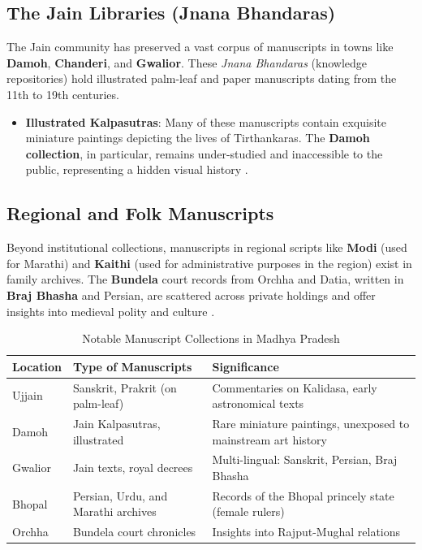 \documentclass{article}
\begin{document}
\subsection{The Jain Libraries (Jnana Bhandaras)}
The Jain community has preserved a vast corpus of manuscripts in towns like \textbf{Damoh}, \textbf{Chanderi}, and \textbf{Gwalior}. These \textit{Jnana Bhandaras} (knowledge repositories) hold illustrated palm-leaf and paper manuscripts dating from the 11th to 19th centuries.
\begin{itemize}
    \item \textbf{Illustrated Kalpasutras}: Many of these manuscripts contain exquisite miniature paintings depicting the lives of Tirthankaras. The \textbf{Damoh collection}, in particular, remains under-studied and inaccessible to the public, representing a hidden visual history \cite{shah2010}.
\end{itemize}

\subsection{Regional and Folk Manuscripts}
Beyond institutional collections, manuscripts in regional scripts like \textbf{Modi} (used for Marathi) and \textbf{Kaithi} (used for administrative purposes in the region) exist in family archives. The \textbf{Bundela} court records from Orchha and Datia, written in \textbf{Braj Bhasha} and Persian, are scattered across private holdings and offer insights into medieval polity and culture \cite{busch2011}.

\begin{table}[h!]
\centering
\caption{Notable Manuscript Collections in Madhya Pradesh}
\label{tab:manuscripts}
\begin{tabular}{|p{4cm}|p{6cm}|p{4cm}|}
\hline
\textbf{Location} & \textbf{Type of Manuscripts} & \textbf{Significance} \\
\hline
Ujjain & Sanskrit, Prakrit (on palm-leaf) & Commentaries on Kalidasa, early astronomical texts \\
\hline
Damoh & Jain Kalpasutras, illustrated & Rare miniature paintings, unexposed to mainstream art history \\
\hline
Gwalior & Jain texts, royal decrees & Multi-lingual: Sanskrit, Persian, Braj Bhasha \\
\hline
Bhopal & Persian, Urdu, and Marathi archives & Records of the Bhopal princely state (female rulers) \\
\hline
Orchha & Bundela court chronicles & Insights into Rajput-Mughal relations \\
\hline
\end{tabular}
\end{table}
\end{document}

